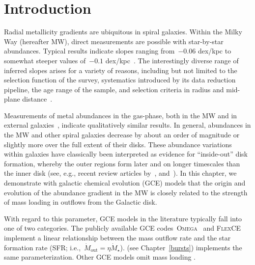 \section{Introduction}
\label{outflows:sec:intro}
\noindent
Radial metallicity gradients are ubiquitous in spiral galaxies.
Within the Milky Way (hereafter MW), direct measurements are possible with
star-by-star abundances.
Typical results indicate slopes ranging from~$-0.06$ dex/kpc to somewhat
steeper values of~$-0.1$ dex/kpc~\citep[e.g.,][]{Nordstroem2004, Cheng2012,
Frinchaboy2013, Hayden2014, Weinberg2019, Myers2022}.
The interestingly diverse range of inferred slopes arises for a variety of
reasons, including but not limited to the selection function of the survey,
systematics introduced by its data reduction pipeline, the age range of the
sample, and selection criteria in radius and mid-plane
distance~\citep[see discussion in, e.g.,~\S~5 of][]{Anders2017}.
\par
Measurements of metal abundances in the gas-phase, both in the MW
\citep[e.g.,][]{Simpson1995, Afflerbach1997, Esteban2022, MendezDelgado2022,
MendezDelgado2023} and in external galaxies~\citep[e.g.,][]{Belfiore2017,
Berg2020, Franchetto2021, Lutz2021, Boardman2022}, indicate qualitatively
similar results.
In general, abundances in the MW and other spiral galaxies decrease by about
an order of magnitude or slightly more over the full extent of their disks.
These abundance variations within galaxies have classically been interpreted as
evidence for ``inside-out'' disk formation, whereby the outer regions form
later and on longer timescales than the inner disk (see, e.g., recent review
articles by~\citealt{Kewley2019, Maiolino2019}, and~\citealt{Sanchez2020}).
In this chapter, we demonstrate with galactic chemical evolution (GCE) models
that the origin and evolution of the abundance gradient in the MW is closely
related to the strength of mass loading in outflows from the Galactic disk.
\par
With regard to this parameter, GCE models in the literature typically fall into
one of two categories.
The publicly available GCE codes~\textsc{Omega}~\citep{Cote2017} and
\textsc{FlexCE}~\citep{Andrews2017} implement a linear relationship between the
mass outflow rate and the star formation rate (SFR;
i.e.,~$\dot{M}_\text{out} = \eta \dot{M}_\star$).
\vice\space(see Chapter~\ref{bursts}) implements the same parameterization.
Other GCE models omit mass loading
\citep[i.e.,~$\eta = 0$; e.g.,][]{Minchev2013, Minchev2014, Spitoni2019,
Spitoni2020, Spitoni2021, Gjergo2023}.




